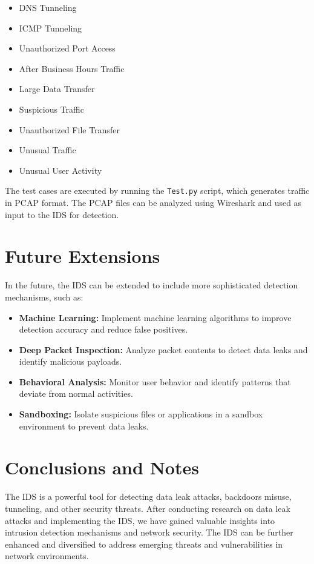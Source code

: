 \documentclass{article}
\begin{document}
\begin{itemize}
    \item DNS Tunneling
    \item ICMP Tunneling
    \item Unauthorized Port Access
    \item After Business Hours Traffic
    \item Large Data Transfer
    \item Suspicious Traffic
    \item Unauthorized File Transfer
    \item Unusual Traffic
    \item Unusual User Activity
\end{itemize}

The test cases are executed by running the \texttt{Test.py} script, which generates traffic in PCAP format. The PCAP files can be analyzed using Wireshark and used as input to the IDS for detection.

\section{Future Extensions}
In the future, the IDS can be extended to include more sophisticated detection mechanisms, such as:
\begin{itemize}
    \item \textbf{Machine Learning:} Implement machine learning algorithms to improve detection accuracy and reduce false positives.
    \item \textbf{Deep Packet Inspection:} Analyze packet contents to detect data leaks and identify malicious payloads.
    \item \textbf{Behavioral Analysis:} Monitor user behavior and identify patterns that deviate from normal activities.
    \item \textbf{Sandboxing:} Isolate suspicious files or applications in a sandbox environment to prevent data leaks.
\end{itemize}
\section{Conclusions and Notes}
The IDS is a powerful tool for detecting data leak attacks, backdoors misuse, tunneling, and other security threats. After conducting research on data leak attacks and implementing the IDS, we have gained valuable insights into intrusion detection mechanisms and network security. The IDS can be further enhanced and diversified to address emerging threats and vulnerabilities in network environments.
\end{document}

